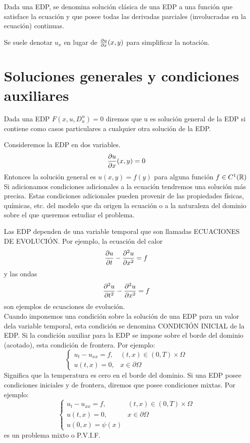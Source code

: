 \begin{Def}
    Dada una EDP, se denomina solución clásica de una EDP a una función que satisface la ecuación y que posee todas las derivadas parciales (involucradas en la ecuación) continuas.
\end{Def}
\begin{Obs}
    Se suele denotar $u_x$ en lugar de $\frac{\partial u}{\partial x}(x,y)$ para simplificar la notación.
\end{Obs}
\section{Soluciones generales y condiciones auxiliares}
Dada una EDP $F(x,u,D^{\alpha}_u)=0$ diremos que u es solución general de la EDP si contiene como casos particulares a cualquier otra solución de la EDP.
\begin{Ejm}
    Consideremos la EDP en dos variables.
    $$\frac{\partial u}{\partial x}(x,y)=0$$
    Entonces la solución general es $u(x,y)=f(y)$ para alguna función $f\in C^1({\mathbb{R}})$\\
    Si adicionamos condiciones adicionales a la ecuación tendremos una solución más precisa. Estas condiciones adicionales pueden provenir de las propiedades físicas, químicas, etc. del modelo que da origen la ecuación o a la naturaleza del dominio sobre el que queremos estudiar el problema.
\end{Ejm}
Las EDP dependen de una variable temporal que son llamadas ECUACIONES DE EVOLUCIÓN. Por ejemplo, la ecuación del calor  $$\frac{\partial u}{\partial t}-\frac{\partial^2u}{\partial x^2}=f$$ y las ondas $$\frac{\partial^2u}{\partial t^2}-\frac{\partial^2u}{\partial x^2}=f$$ son ejemplos de ecuaciones de evolución.\\Cuando imponemos una condición sobre la solución de una EDP para un valor dela variable temporal, esta condición se denomina CONDICIÓN INICIAL de la EDP.
Si la condición auxiliar para la EDP se impone sobre el borde del dominio (acotado), esta condición de frontera. Por ejemplo:
$$
\begin{cases}
    u_t-u_{x x}=f,
    & \mbox{$(t,x)\in (0,T)\times\Omega$}\\
    u(t,x)=0, & \mbox{$x\in\partial\Omega$}
\end{cases}
$$
Significa que la temperatura es cero en el borde del dominio. Si una EDP posee condiciones iniciales y de frontera, diremos que posee condiciones mixtas. Por ejemplo:$$
\begin{cases}
    u_t-u_{x x}=f,
    & \mbox{$(t,x)\in (0,T)\times\Omega$}\\
    u(t,x)=0, & \mbox{$x\in\partial\Omega$}\\
    u(0,x)=\psi(x)
\end{cases}
$$
es un problema mixto o P.V.I.F.